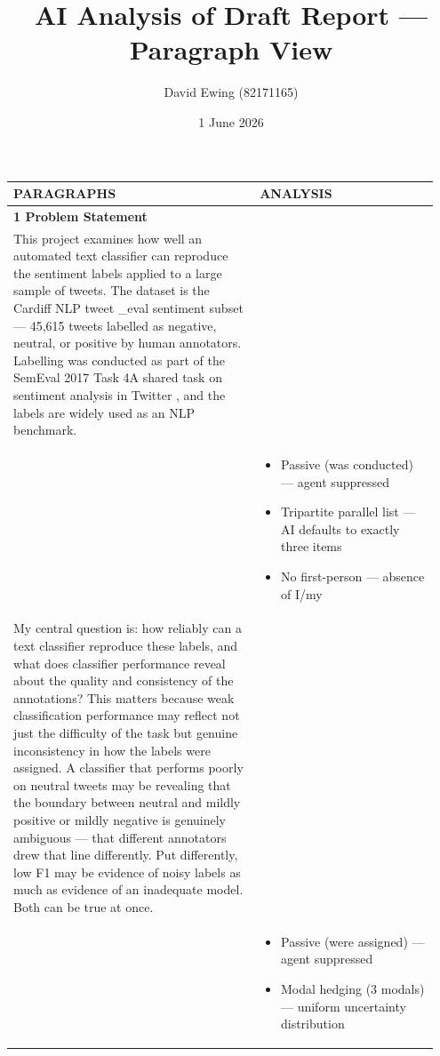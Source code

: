\documentclass[11pt]{article}
\title{AI Analysis of Draft Report --- Paragraph View}
\author{David Ewing (82171165)}
\date{1 June 2026}
\begin{document}
\maketitle
\thispagestyle{empty}
\newpage

\setlength{\LTleft}{0pt}
\setlength{\LTright}{0pt}
\begin{longtable}{|p{0.55\linewidth}|p{0.40\linewidth}|}
\hline
\centering\textbf{PARAGRAPHS} & \centering\textbf{ANALYSIS} \tabularnewline[2pt]
\hline
\endhead
\textbf{1 Problem Statement}\\[4pt]
This project examines how well an automated text classifier can reproduce the sentiment labels applied to a large sample of tweets. The dataset is the Cardiff NLP tweet \_eval sentiment subset --- 45,615 tweets labelled as negative, neutral, or positive by human annotators. Labelling was conducted as part of the SemEval 2017 Task 4A shared task on sentiment analysis in Twitter , and the labels are widely used as an NLP benchmark. & \\[2pt]
\hline
\rule[-3.5cm]{0pt}{3.5cm} & \begin{itemize}[leftmargin=1em,itemsep=1pt,topsep=1pt,parsep=0pt]
  \item Passive (was conducted) --- agent suppressed
  \item Tripartite parallel list --- AI defaults to exactly three items
  \item No first-person --- absence of I/my
\end{itemize} \\
\hline
My central question is: how reliably can a text classifier reproduce these labels, and what does classifier performance reveal about the quality and consistency of the annotations? This matters because weak classification performance may reflect not just the difficulty of the task but genuine inconsistency in how the labels were assigned. A classifier that performs poorly on neutral tweets may be revealing that the boundary between neutral and mildly positive or mildly negative is genuinely ambiguous --- that different annotators drew that line differently. Put differently, low F1 may be evidence of noisy labels as much as evidence of an inadequate model. Both can be true at once. & \\[2pt]
\hline
\rule[-3.5cm]{0pt}{3.5cm} & \begin{itemize}[leftmargin=1em,itemsep=1pt,topsep=1pt,parsep=0pt]
  \item Passive (were assigned) --- agent suppressed
  \item Modal hedging (3 modals) --- uniform uncertainty distribution

\end{itemize}
\end{longtable}
\end{document}
